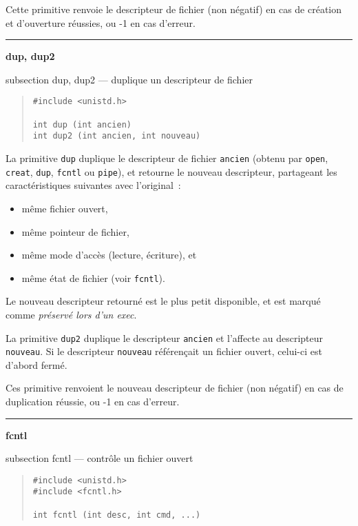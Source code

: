 \documentclass [twoside] {report}
\newcommand {\primitive} [1]
    {
	\phantomsection
	{\large \bf #1}
	\addcontentsline {toc} {subsection} {#1}
    }
\newcommand {\separation}
    {
	\vspace {5mm}
	\nopagebreak
	\hrule
    }
\begin{document}
Cette primitive renvoie le descripteur de fichier
(non négatif) en cas de création et d'ouverture
réussies, ou -1 en cas d'erreur.




\separation
\primitive {dup, dup2} --- duplique un descripteur de fichier

\begin {quote}
\begin {verbatim}
#include <unistd.h>

int dup (int ancien)
int dup2 (int ancien, int nouveau)
\end{verbatim}
\end {quote}

La primitive {\tt dup} duplique le descripteur de
fichier {\tt ancien} (obtenu par {\tt open}, {\tt creat},
{\tt dup}, {\tt fcntl} ou {\tt pipe}), et retourne le
nouveau descripteur, partageant les
caractéristiques suivantes avec l'original~:

\begin {itemize}
    \item même fichier ouvert,
    \item même pointeur de fichier,
    \item même mode d'accès (lecture, écriture), et
    \item même état de fichier (voir {\tt fcntl}).
\end {itemize}

Le nouveau descripteur retourné est le plus petit
disponible, et est marqué comme {\it préservé lors
d'un exec}.

La primitive {\tt dup2} duplique le descripteur {\tt ancien} et
l'affecte au descripteur {\tt nouveau}. Si le descripteur {\tt nouveau}
référençait un fichier ouvert, celui-ci est d'abord fermé.

Ces primitive renvoient le nouveau descripteur de fichier
(non négatif) en cas de duplication
réussie, ou -1 en cas d'erreur.




\separation
\primitive {fcntl} --- contrôle un fichier ouvert

\begin {quote}
\begin {verbatim}
#include <unistd.h>
#include <fcntl.h>

int fcntl (int desc, int cmd, ...)
\end{verbatim}
\end {quote}
\end{document}
